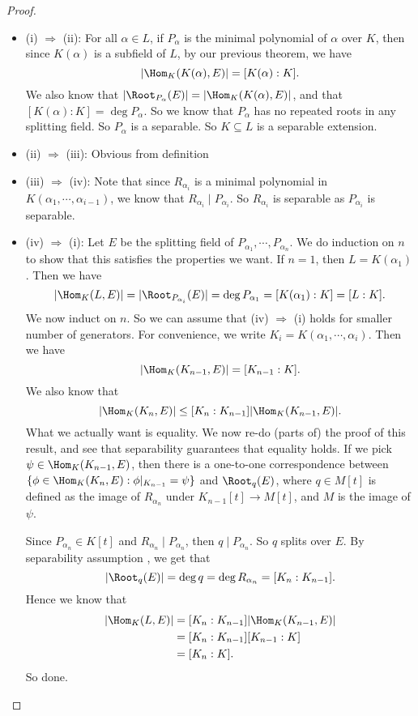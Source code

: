 \documentclass[a4paper]{article}
\begin{document}
\begin{proof}\leavevmode
  \begin{itemize}
    \item (i) $\Rightarrow$ (ii): For all $\alpha \in L$, if $P_\alpha$ is the minimal polynomial of $\alpha$ over $K$, then since $K(\alpha)$ is a subfield of $L$, by our previous theorem, we have
      \[
        |\Hom_K(K(\alpha), E)| = [K(\alpha): K].
      \]
      We also know that $|\Root_{P_\alpha}(E)| = |\Hom_K(K(\alpha), E)|$, and that $[K(\alpha): K] = \deg P_\alpha$. So we know that $P_\alpha$ has no repeated roots in any splitting field. So $P_\alpha$ is a separable. So $K\subseteq L$ is a separable extension.
    \item (ii) $\Rightarrow$ (iii): Obvious from definition
    \item (iii) $\Rightarrow$ (iv): Note that since $R_{\alpha_i}$ is a minimal polynomial in $K(\alpha_1, \cdots, \alpha_{i - 1})$, we know that $R_{\alpha_i} \mid P_{\alpha_i}$. So $R_{\alpha_i}$ is separable as $P_{\alpha_i}$ is separable.
    \item (iv) $\Rightarrow$ (i): Let $E$ be the splitting field of $P_{\alpha_1}, \cdots, P_{\alpha_n}$. We do induction on $n$ to show that this satisfies the properties we want. If $n = 1$, then $L = K(\alpha_1)$. Then we have
      \[
        |\Hom_K(L, E)| = |\Root_{P_{\alpha_i}}(E)| = \deg P_{\alpha_1} = [K(\alpha_1): K] = [L:K].
      \]
      We now induct on $n$. So we can assume that (iv) $\Rightarrow $ (i) holds for smaller number of generators. For convenience, we write $K_i = K(\alpha_1, \cdots, \alpha_i)$. Then we have
      \[
        |\Hom_K(K_{n - 1}, E)| = [K_{n - 1}: K].
      \]
      We also know that
      \[
        |\Hom_K(K_n, E)| \leq [K_n: K_{n - 1}] |\Hom_K(K_{n - 1}, E)|.
      \]
      What we actually want is equality. We now re-do (parts of) the proof of this result, and see that separability guarantees that equality holds. If we pick $\psi \in \Hom_K(K_{n - 1}, E)$, then there is a one-to-one correspondence between $\{\phi \in \Hom_K(K_n, E): \phi|_{K_{n - 1}} = \psi\}$ and $\Root_q(E)$, where $q \in M[t]$ is defined as the image of $R_{\alpha_n}$ under $K_{n - 1}[t] \to M[t]$, and $M$ is the image of $\psi$.

      Since $P_{\alpha_n} \in K[t]$ and $R_{\alpha_n} \mid P_{\alpha_n}$, then $q \mid P_{\alpha_n}$. So $q$ splits over $E$. By separability assumption , we get that
      \[
        |\Root_q(E)| = \deg q = \deg R_{\alpha_n} = [K_n: K_{n - 1}].
      \]
      Hence we know that
      \begin{align*}
        |\Hom_K(L, E)| &= [K_n: K_{n - 1}] | \Hom_K(K_{n - 1}, E)|\\
        &= [K_n: K_{n - 1}][K_{n - 1}: K]\\
        &= [K_n: K].
      \end{align*}
      So done.
  \end{itemize}
\end{proof}
\end{document}
